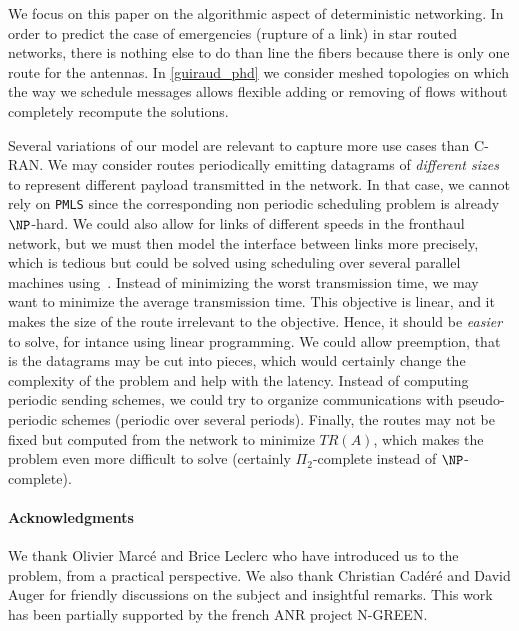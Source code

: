 \documentclass[a4paper,10pt]{journal}
\newcommand\PMLS{\texttt{PMLS}\xspace}
\begin{document}
     We focus on this paper on the algorithmic aspect of deterministic networking. In order to predict the case of emergencies (rupture of a link) in star routed networks, there is nothing else to do than line the fibers because there is only one route for the antennas. In \ref{guiraud_phd} we consider meshed topologies on which the way we schedule messages allows flexible adding or removing of flows without completely recompute the solutions.

   	Several variations of our model are relevant to capture more use cases than C-RAN. 
   	We may consider routes periodically emitting datagrams of \emph{different sizes} to represent different payload transmitted in the network. In that case, we cannot rely on \PMLS since the corresponding non periodic scheduling problem is already $\NP$-hard. 
   	We could also allow for links of different speeds in the fronthaul network, but we must then model
   	the interface between links more precisely, which is tedious but could be solved using scheduling over several parallel machines using~\cite{simons1989fast}.
	Instead of minimizing the worst transmission time, we may want to minimize the average transmission time. This objective is linear, and it makes the size of the route irrelevant to the objective. Hence, it should be \emph{easier} to solve, for intance using linear programming. We could allow preemption, that is the datagrams may be cut into pieces, which would certainly change the complexity of the problem and help with the latency.  
   	Instead of computing periodic sending schemes, we could try to organize communications with pseudo-periodic schemes (periodic over several periods). Finally, the routes may not be fixed but computed from the network to minimize $TR(A)$, which makes the problem even more difficult to solve (certainly $\Pi_2$-complete instead of $\NP$-complete). 





 	\paragraph*{Acknowledgments} 
 	We thank Olivier Marcé and Brice Leclerc who have introduced us to the problem, from a practical perspective. We also thank Christian Cad\'er\'e and David Auger for friendly discussions on the subject and insightful remarks. This work has been partially supported by the french ANR project N-GREEN.



\end{document}
